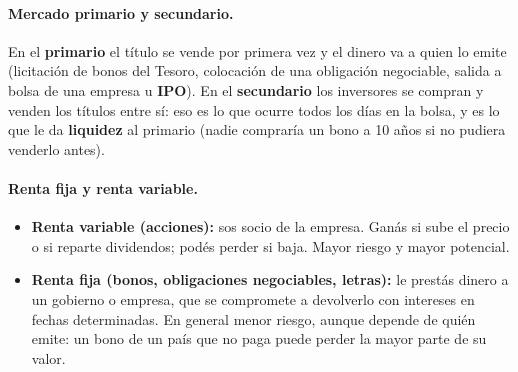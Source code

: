 \begin{center}
\end{center}

\paragraph*{Mercado primario y secundario.}
En el \textbf{primario} el título se vende por primera vez y el dinero va a quien lo emite
(licitación de bonos del Tesoro, colocación de una obligación negociable, salida a bolsa de una
empresa u \textbf{IPO}). En el \textbf{secundario} los inversores se compran y venden los
títulos entre sí: eso es lo que ocurre todos los días en la bolsa, y es lo que le da
\textbf{liquidez} al primario (nadie compraría un bono a 10 años si no pudiera venderlo antes).

\paragraph*{Renta fija y renta variable.}
\begin{itemize}
  \item \textbf{Renta variable (acciones):} sos socio de la empresa. Ganás si sube el precio o
        si reparte dividendos; podés perder si baja. Mayor riesgo y mayor potencial.
  \item \textbf{Renta fija (bonos, obligaciones negociables, letras):} le prestás dinero a un
        gobierno o empresa, que se compromete a devolverlo con intereses en fechas
        determinadas. En general menor riesgo, aunque depende de quién emite: un bono de un
        país que no paga puede perder la mayor parte de su valor.
\end{itemize}


